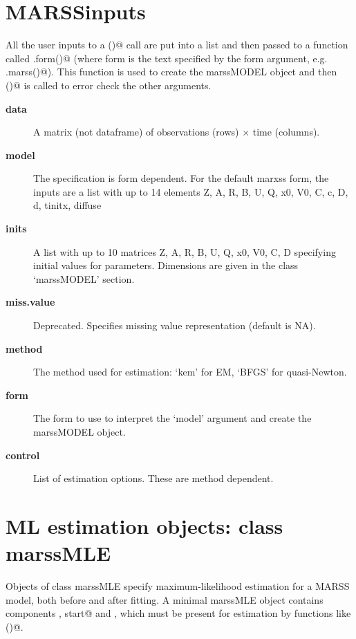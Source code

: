 \section*{MARSSinputs}

All the user inputs to a \verb@MARSS()@ call are put into a list and then passed to a function called \verb@MARSS.form()@ (where form is the text specified by the form argument, e.g. \verb@MARSS.marss()@).  This function is used to create the marssMODEL object and then \verb@MARSScheckinputs()@ is called to error check the other arguments.

  \begin{description}
  
  \item[\textbf{data}]{ A matrix (not dataframe) of observations (rows) $\times$ time (columns).  }
  \item[\textbf{model}]{ The specification is form dependent.  For the default marxss form, the inputs are a list with up to 14  elements Z, A, R, B, U, Q, x0, V0, C, c, D, d, tinitx, diffuse }
  \item[\textbf{inits}]{ A list with up to 10 matrices Z, A, R, B, U, Q, x0, V0, C, D specifying initial values for parameters. Dimensions are given in the class `marssMODEL' section. }
  \item[\textbf{miss.value}]{ Deprecated. Specifies missing value representation (default is NA). }
  \item[\textbf{method}]{ The method used for estimation: `kem' for EM, `BFGS' for quasi-Newton.}
  \item[\textbf{form}]{ The form to use to interpret the `model' argument and create the marssMODEL object.}
  \item[\textbf{control}]{ List of estimation options. These are method dependent. }  
  \end{description}


\section*{ML estimation objects: class marssMLE}

Objects of class marssMLE specify maximum-likelihood estimation for a MARSS model, both before and after fitting. A minimal marssMLE object contains components \verb@model, start@ and \verb@control@, which must be present for estimation by functions like \verb@MARSSkem()@.

